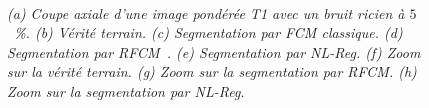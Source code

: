 \begin{figure}[!thbp]
\begin{center}
\\
\caption{\emph{(a) Coupe axiale d'une image pondérée T1 avec un bruit ricien à $5$~\%. (b) Vérité terrain. (c) Segmentation par FCM classique. (d) Segmentation par RFCM~\cite{Pham:CVIU:2001}. (e) Segmentation par NL-Reg. (f) Zoom sur la vérité terrain. (g) Zoom sur la segmentation par RFCM. (h) Zoom sur la segmentation par NL-Reg.}\label{FIG:VIEW:BRAINWEB:NOISE}}
\end{center}
\end{figure}

